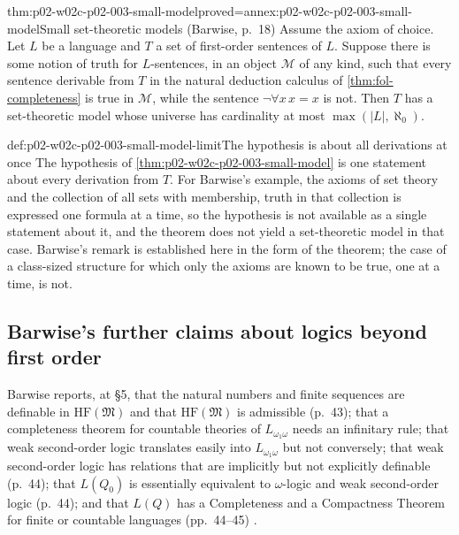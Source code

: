 \begin{hbtheorem}{thm:p02-w02c-p02-003-small-model}{proved=annex:p02-w02c-p02-003-small-model}{Small set-theoretic models (Barwise, p.~18)}
Assume the axiom of choice.  Let \(L\) be a language and \(T\) a set of
first-order sentences of \(L\).  Suppose there is some notion of truth for
\(L\)-sentences, in an object \(\mathcal M\) of any kind, such that every
sentence derivable from \(T\) in the natural deduction calculus of
\cref{thm:fol-completeness} is true in \(\mathcal M\), while the sentence
\(\neg\forall x\,x=x\) is not.  Then \(T\) has a set-theoretic model whose
universe has cardinality at most \(\max(\lvert L\rvert,\aleph_0)\).
\end{hbtheorem}

\begin{hbwarning}{def:p02-w02c-p02-003-small-model-limit}{The hypothesis is about all derivations at once}
The hypothesis of \cref{thm:p02-w02c-p02-003-small-model} is one statement
about every derivation from \(T\).  For Barwise's example, the axioms of
set theory and the collection of all sets with membership, truth in that
collection is expressed one formula at a time, so the hypothesis is not
available as a single statement about it, and the theorem does not yield a
set-theoretic model in that case.  Barwise's remark is established here in
the form of the theorem; the case of a class-sized structure for which only
the axioms are known to be true, one at a time, is not.
\end{hbwarning}

\subsection{Barwise's further claims about logics beyond first order}
\label{sec:p02-w02c-p02-003-beyond}

Barwise reports, at \S5, that the natural numbers and finite sequences are
definable in \(\mathrm{HF}(\mathfrak M)\) and that
\(\mathrm{HF}(\mathfrak M)\) is admissible (p.~43); that a completeness
theorem for countable theories of \(L_{\omega_1\omega}\) needs an
infinitary rule; that weak second-order logic translates easily into
\(L_{\omega_1\omega}\) but not conversely; that weak second-order logic has
relations that are implicitly but not explicitly definable (p.~44); that
\(L(Q_0)\) is essentially equivalent to \(\omega\)-logic and weak
second-order logic (p.~44); and that \(L(Q)\) has a Completeness and a
Compactness Theorem for finite or countable languages (pp.~44--45)
\cite[ch.~A.1, \S5]{Barwise1977FirstOrder}.

